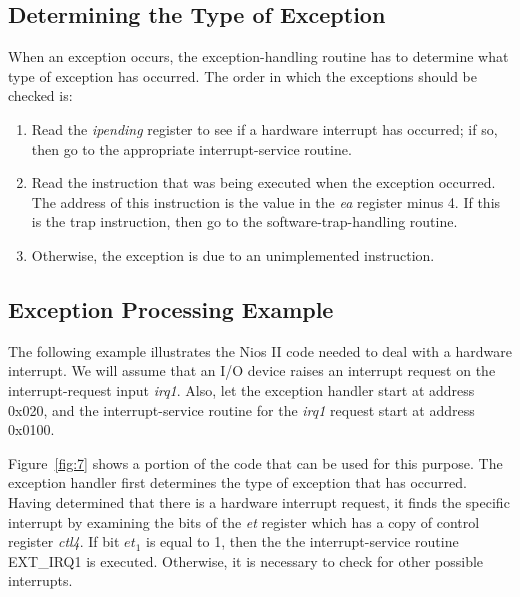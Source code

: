\documentclass[11pt, twoside, pdftex]{article}
\begin{document}
\subsection{Determining the Type of Exception}

When an exception occurs, the exception-handling routine has to determine what
type of exception has occurred. The order in which the exceptions should be
checked is:
\begin{enumerate}
\item Read the {\it ipending} register to see if a hardware interrupt has occurred;
if so, then go to the appropriate interrupt-service routine.
\item Read the instruction that was being executed when the exception occurred.
The address of this instruction is the value in the {\it ea} register minus 4.
If this is the {\sf trap} instruction, then go to the software-trap-handling routine.
\item Otherwise, the exception is due to an unimplemented instruction.
\end{enumerate}

\subsection{Exception Processing Example}

The following example illustrates the Nios II code needed to deal with a hardware
interrupt. We will assume that an I/O device raises an interrupt request on the
interrupt-request input {\it irq1}. Also, let the exception handler start at 
address 0x020, and the interrupt-service routine for the {\it irq1} request
start at address 0x0100. 

Figure~\ref{fig:7} shows a portion of the code that can be used for this purpose.
The exception handler first determines the type of exception that has occurred.
Having determined that there is a hardware interrupt request, it finds the
specific interrupt by examining the bits of the {\it et} register which has
a copy of control register {\it ctl4}. If bit $et_1$ is equal to 1, then the
the interrupt-service routine EXT\_IRQ1 is executed. Otherwise, it is necessary
to check for other possible interrupts.
\end{document}
